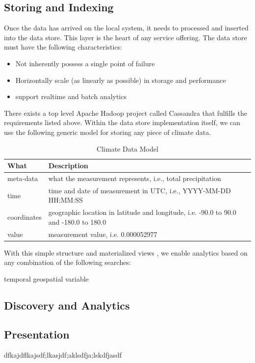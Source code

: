 \subsection*{Storing and Indexing}
Once the data has arrived on the local system, it needs to processed and inserted into the data store. This layer is the heart of any service offering. The data store must have the following characteristics:
\begin{itemize}
	\item Not inherently possess a single point of failure
	\item Horizontally scale (as linearly as possible) in storage and performance
	\item support realtime and batch analytics
\end{itemize}
There exists a top level Apache Hadoop project called Cassandra\cite{cassandra} that fulfills the requirements listed above. Within the data store implementation itself, we can use the following generic model for storing any piece of climate data.
\begin{table}[htbp]
	\caption*{Climate Data Model}
	\centering
	\begin{tabular}{l l}
		\hline
		What & Description \\ [0.5ex]
		\hline
		meta-data & what the measurement represents, i.e., total precipitation\\
		time & time and date of measurement in UTC, i.e., YYYY-MM-DD HH:MM:SS\\
		coordinates & geographic location in latitude and longitude, i.e. -90.0 to 90.0 and -180.0 to 180.0\\
		value & measurement value, i.e. 0.000052977\\
		\hline
	\end{tabular}
\end{table}

With this simple structure and materialized views \cite{materialized_views}, we enable analytics based on any combination of the following searches:

temporal 
geospatial
variable

\subsection*{Discovery and Analytics}

\subsection*{Presentation}
dfkajdflkajsdf;lkasjdf;aklsdfja;lskdfjasdf\\

